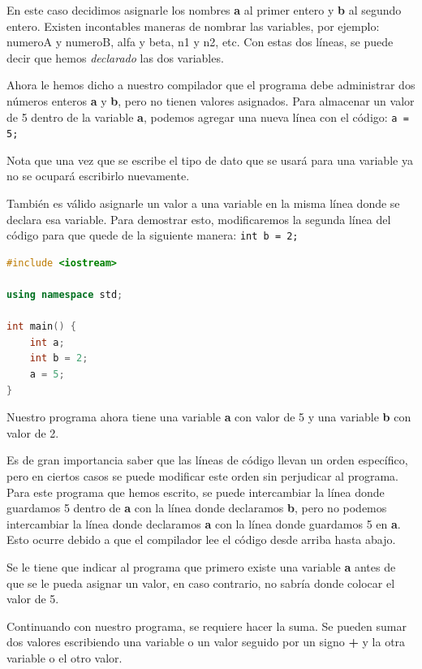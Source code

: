 \documentclass{article}
\begin{document}
En este caso decidimos asignarle los nombres \textbf{a} al primer entero y \textbf{b} al segundo entero. Existen incontables maneras de nombrar las variables, por ejemplo: numeroA y numeroB, alfa y beta, n1 y n2, etc. Con estas dos líneas, se puede decir que hemos \textit{declarado} las dos variables.

Ahora le hemos dicho a nuestro compilador que el programa debe administrar dos números enteros \textbf{a} y \textbf{b}, pero no tienen valores asignados. Para almacenar un valor de 5 dentro de la variable \textbf{a}, podemos agregar una nueva línea con el código: \lstinline{a = 5;}

Nota que una vez que se escribe el tipo de dato que se usará para una variable ya no se ocupará escribirlo nuevamente.

También es válido asignarle un valor a una variable en la misma línea donde se declara esa variable. Para demostrar esto, modificaremos la segunda línea del código para que quede de la siguiente manera: \lstinline{int b = 2;}

\begin{lstlisting}[language=C++, title=Guardando valores]
#include <iostream>

using namespace std;

int main() {
	int a;
	int b = 2;
	a = 5;
}
\end{lstlisting}

Nuestro programa ahora tiene una variable \textbf{a} con valor de 5 y una variable \textbf{b} con valor de 2.

Es de gran importancia saber que las líneas de código llevan un orden específico, pero en ciertos casos se puede modificar este orden sin perjudicar al programa. Para este programa que hemos escrito, se puede intercambiar la línea donde guardamos 5 dentro de \textbf{a} con la línea donde declaramos \textbf{b}, pero no podemos intercambiar la línea donde declaramos \textbf{a} con la línea donde guardamos 5 en \textbf{a}. Esto ocurre debido a que el compilador lee el código desde arriba hasta abajo.

Se le tiene que indicar al programa que primero existe una variable \textbf{a} antes de que se le pueda asignar un valor, en caso contrario, no sabría donde colocar el valor de 5.

Continuando con nuestro programa, se requiere hacer la suma. Se pueden sumar dos valores escribiendo una variable o un valor seguido por un signo \textbf{+} y la otra variable o el otro valor.
\end{document}
